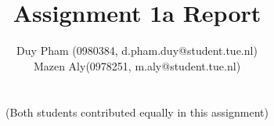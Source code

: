 \documentclass[10pt, a4paper, titlepage]{article} %
\begin{document}
    \title{\rmfamily\normalfont{}\\
    Assignment 1a Report}
    \author{Duy Pham (0980384, d.pham.duy@student.tue.nl) \\ 
    Mazen Aly(0978251, m.aly@student.tue.nl) \\\\\\
    (Both students contributed equally in this assignment)}
    \date{} %
    
    \maketitle
    

    
    
    
    
\end{document}
